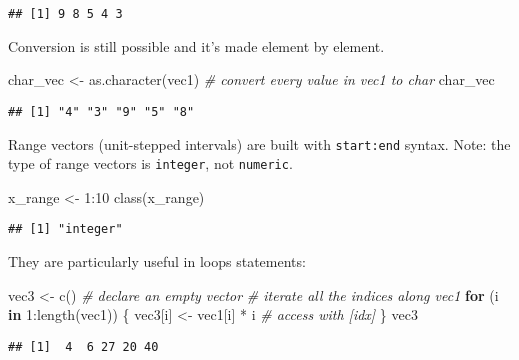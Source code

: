 \documentclass[
  oneside]{book}
\newenvironment{Shaded}{\begin{snugshade}}{\end{snugshade}}
\newcommand{\CommentTok}[1]{\textcolor[rgb]{0.56,0.35,0.01}{\textit{#1}}}
\newcommand{\ControlFlowTok}[1]{\textcolor[rgb]{0.13,0.29,0.53}{\textbf{#1}}}
\newcommand{\DecValTok}[1]{\textcolor[rgb]{0.00,0.00,0.81}{#1}}
\newcommand{\FunctionTok}[1]{\textcolor[rgb]{0.00,0.00,0.00}{#1}}
\newcommand{\NormalTok}[1]{#1}
\newcommand{\OtherTok}[1]{\textcolor[rgb]{0.56,0.35,0.01}{#1}}
\newcommand{\SpecialCharTok}[1]{\textcolor[rgb]{0.00,0.00,0.00}{#1}}
\begin{document}
\begin{verbatim}
## [1] 9 8 5 4 3
\end{verbatim}

Conversion is still possible and it's made element by element.

\begin{Shaded}
\begin{Highlighting}[]
\NormalTok{char\_vec }\OtherTok{\textless{}{-}} \FunctionTok{as.character}\NormalTok{(vec1) }\CommentTok{\# convert every value in vec1 to char}
\NormalTok{char\_vec}
\end{Highlighting}
\end{Shaded}

\begin{verbatim}
## [1] "4" "3" "9" "5" "8"
\end{verbatim}

Range vectors (unit-stepped intervals) are built with \texttt{start:end} syntax.
Note: the type of range vectors is \texttt{integer}, not \texttt{numeric}.

\begin{Shaded}
\begin{Highlighting}[]
\NormalTok{x\_range }\OtherTok{\textless{}{-}} \DecValTok{1}\SpecialCharTok{:}\DecValTok{10}
\FunctionTok{class}\NormalTok{(x\_range)}
\end{Highlighting}
\end{Shaded}

\begin{verbatim}
## [1] "integer"
\end{verbatim}

They are particularly useful in loops statements:

\begin{Shaded}
\begin{Highlighting}[]
\NormalTok{vec3 }\OtherTok{\textless{}{-}} \FunctionTok{c}\NormalTok{() }\CommentTok{\# declare an empty vector}
\CommentTok{\# iterate all the indices along vec1}
\ControlFlowTok{for}\NormalTok{ (i }\ControlFlowTok{in} \DecValTok{1}\SpecialCharTok{:}\FunctionTok{length}\NormalTok{(vec1)) \{}
\NormalTok{  vec3[i] }\OtherTok{\textless{}{-}}\NormalTok{ vec1[i] }\SpecialCharTok{*}\NormalTok{ i }\CommentTok{\# access with [idx]}
\NormalTok{\}}
\NormalTok{vec3}
\end{Highlighting}
\end{Shaded}

\begin{verbatim}
## [1]  4  6 27 20 40
\end{verbatim}
\end{document}
